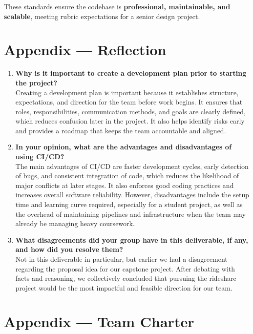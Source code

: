 \documentclass{article}
\begin{document}
These standards ensure the codebase is \textbf{professional, maintainable, and scalable}, meeting rubric expectations for a senior design project.

\newpage{}

\section*{Appendix --- Reflection}



\begin{enumerate}
  \item \textbf{Why is it important to create a development plan prior to starting the project?} \\ 
  Creating a development plan is important because it establishes structure, expectations, and direction for the team before work begins. It ensures that roles, responsibilities, communication methods, and goals are clearly defined, which reduces confusion later in the project. It also helps identify risks early and provides a roadmap that keeps the team accountable and aligned.
  \item \textbf{In your opinion, what are the advantages and disadvantages of using CI/CD?} \\ 
  The main advantages of CI/CD are faster development cycles, early detection of bugs, and consistent integration of code, which reduces the likelihood of major conflicts at later stages. It also enforces good coding practices and increases overall software reliability. However, disadvantages include the setup time and learning curve required, especially for a student project, as well as the overhead of maintaining pipelines and infrastructure when the team may already be managing heavy coursework.
  \item \textbf{What disagreements did your group have in this deliverable, if any, and how did you resolve them?} \\ 
  Not in this deliverable in particular, but earlier we had a disagreement regarding the proposal idea for our capstone project. After debating with facts and reasoning, we collectively concluded that pursuing the rideshare project would be the most impactful and feasible direction for our team.
\end{enumerate}

\newpage{}

\section*{Appendix --- Team Charter}
\end{document}
